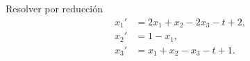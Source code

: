 Resolver por reducción
\[\begin{aligned}x_1'&=2x_1+x_2-2x_3-t+2,\\x_2'&=1-x_1,\\x_3'&=x_1+x_2-x_3-t+1.\end{aligned}\]
